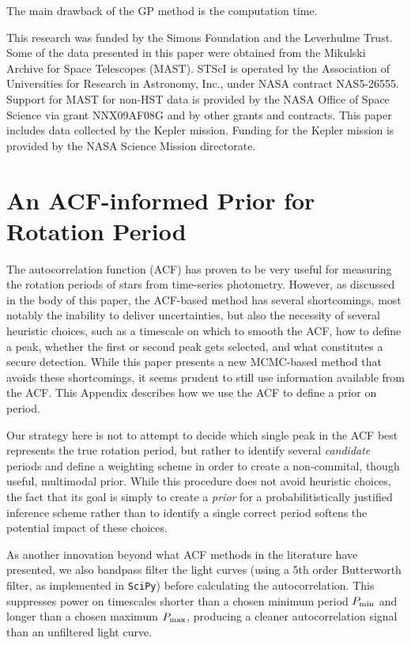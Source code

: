 \documentclass[useAMS, usenatbib, preprint, 12pt]{aastex}
\begin{document}
The main drawback of the GP method is the computation time.

This research was funded by the Simons Foundation and the Leverhulme Trust.
Some of the data presented in this paper were obtained from the Mikulski
Archive for Space Telescopes (MAST).
STScI is operated by the Association of Universities for Research in
Astronomy, Inc., under NASA contract NAS5-26555.
Support for MAST for non-HST data is provided by the NASA Office of Space
Science via grant NNX09AF08G and by other grants and contracts.
This paper includes data collected by the Kepler mission. Funding for the
Kepler mission is provided by the NASA Science Mission directorate.

\appendix

\section{An ACF-informed Prior for Rotation Period}

The autocorrelation function (ACF) has proven to be very useful
for measuring the rotation periods of stars from time-series
photometry.  
However, as discussed in the body of this paper, the
ACF-based method has several shortcomings, 
most notably the inability to deliver uncertainties, but also 
the necessity of several heuristic choices, 
such as a timescale on which to smooth the ACF, 
how to define a peak, whether the first or second peak 
gets selected, and what constitutes a secure detection.
While this paper presents a new MCMC-based method
that avoids these shortcomings, 
it seems prudent to still use information available from the ACF.
This Appendix describes how we use the ACF to define a prior on period.

Our strategy here is not to attempt to decide which single
peak in the ACF best represents the true rotation period,
but rather to identify several \emph{candidate} periods and define
a weighting scheme in order to create a non-commital, though useful, 
multimodal prior.  While this procedure does not avoid heuristic choices, 
the fact that its goal is simply to create a \emph{prior} for a 
probabilitistically justified inference scheme rather than
to identify a single correct period softens the potential impact 
of these choices.

As another innovation beyond what ACF methods in the literature have 
presented, we also bandpass filter the light curves (using a 5th order
Butterworth filter, as implemented in \texttt{SciPy}) before calculating the 
autocorrelation.  This suppresses power on timescales shorter than a chosen 
minimum period $P_{\rm min}$ and longer than a chosen maximum $P_{\rm max}$,
producing a cleaner autocorrelation signal than an unfiltered light curve.
\end{document}
